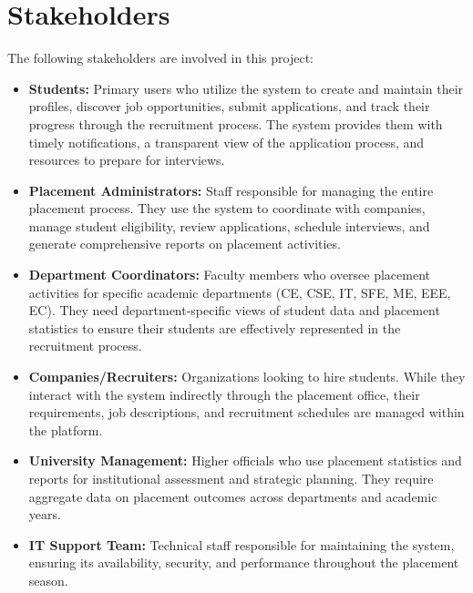 \documentclass[12pt,a4paper]{report}
\begin{document}
\section{Stakeholders}
The following stakeholders are involved in this project:
\begin{itemize}
    \item \textbf{Students:} Primary users who utilize the system to create and maintain their profiles, discover job opportunities, submit applications, and track their progress through the recruitment process. The system provides them with timely notifications, a transparent view of the application process, and resources to prepare for interviews.
    
    \item \textbf{Placement Administrators:} Staff responsible for managing the entire placement process. They use the system to coordinate with companies, manage student eligibility, review applications, schedule interviews, and generate comprehensive reports on placement activities.
    
    \item \textbf{Department Coordinators:} Faculty members who oversee placement activities for specific academic departments (CE, CSE, IT, SFE, ME, EEE, EC). They need department-specific views of student data and placement statistics to ensure their students are effectively represented in the recruitment process.
    
    \item \textbf{Companies/Recruiters:} Organizations looking to hire students. While they interact with the system indirectly through the placement office, their requirements, job descriptions, and recruitment schedules are managed within the platform.
    
    \item \textbf{University Management:} Higher officials who use placement statistics and reports for institutional assessment and strategic planning. They require aggregate data on placement outcomes across departments and academic years.
    
    \item \textbf{IT Support Team:} Technical staff responsible for maintaining the system, ensuring its availability, security, and performance throughout the placement season.
\end{itemize}
\end{document}
